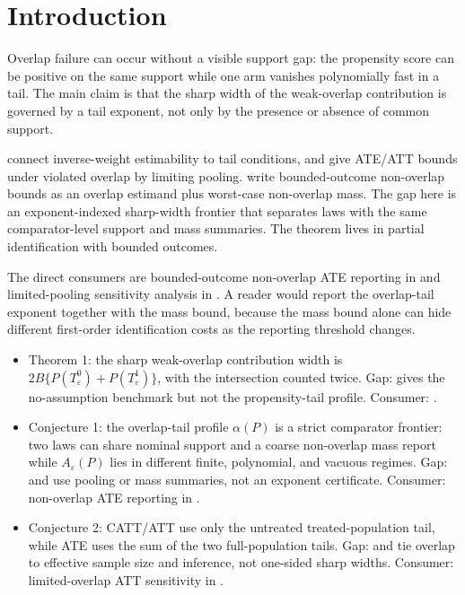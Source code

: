 \documentclass[11pt]{article}
\theoremstyle{definition}
\theoremstyle{plain}
\theoremstyle{remark}
\begin{document}
\section{Introduction}
Overlap failure can occur without a visible support gap: the propensity score can be
positive on the same support while one arm vanishes polynomially fast in a tail. The main
claim is that the sharp width of the weak-overlap contribution is governed by a tail
exponent, not only by the presence or absence of common support.

\citet[p.~2021]{KhanTamer2010IrregularIdentification} connect inverse-weight estimability
to tail conditions, and \citet[Abstract, pp.~1--2]{LeeWeidner2026LimitedPoolingBounds}
give ATE/ATT bounds under violated overlap by limiting pooling. \citet[Sec.~2]{SusmannMcCleanDiaz2025NonOverlapATEBounds}
write bounded-outcome non-overlap bounds as an overlap estimand plus worst-case
non-overlap mass. The gap here is an exponent-indexed sharp-width frontier that separates
laws with the same comparator-level support and mass summaries. The theorem lives in
partial identification with bounded outcomes.

The direct consumers are bounded-outcome non-overlap ATE reporting in
\citet{SusmannMcCleanDiaz2025NonOverlapATEBounds} and limited-pooling sensitivity
analysis in \citet{LeeWeidner2026LimitedPoolingBounds}. A reader would report the
overlap-tail exponent together with the mass bound, because the mass bound alone can hide
different first-order identification costs as the reporting threshold changes.

\begin{itemize}[leftmargin=*]
\item Theorem 1: the sharp weak-overlap contribution width is \(2B\{P(T_\varepsilon^0)+P(T_\varepsilon^1)\}\), with the intersection counted twice. Gap: \citet{Manski1990NonparametricBounds} gives the no-assumption benchmark but not the propensity-tail profile. Consumer: \citet{SusmannMcCleanDiaz2025NonOverlapATEBounds}.
\item Conjecture 1: the overlap-tail profile \(\alpha(P)\) is a strict comparator frontier: two laws can share nominal support and a coarse non-overlap mass report while \(A_\varepsilon(P)\) lies in different finite, polynomial, and vacuous regimes. Gap: \citet{LeeWeidner2026LimitedPoolingBounds} and \citet{SusmannMcCleanDiaz2025NonOverlapATEBounds} use pooling or mass summaries, not an exponent certificate. Consumer: non-overlap ATE reporting in \citet{SusmannMcCleanDiaz2025NonOverlapATEBounds}.
\item Conjecture 2: CATT/ATT use only the untreated treated-population tail, while ATE uses the sum of the two full-population tails. Gap: \citet{HongLeungLi2020FinitePopulationLimitedOverlap} and \citet{Rothe2017LimitedOverlapCI} tie overlap to effective sample size and inference, not one-sided sharp widths. Consumer: limited-overlap ATT sensitivity in \citet{LeeWeidner2026LimitedPoolingBounds}.
\end{itemize}
\end{document}
